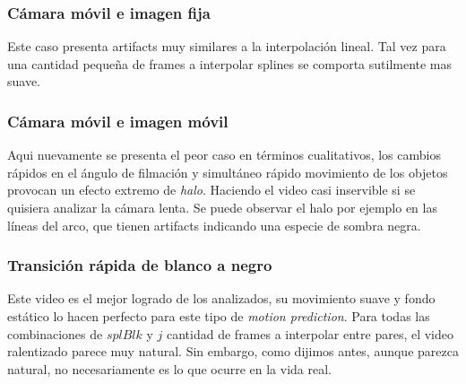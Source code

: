 \subsubsection{Cámara móvil e imagen fija}
Este caso presenta artifacts muy similares a la interpolación lineal. Tal vez para una cantidad pequeña de frames a interpolar splines se comporta sutilmente mas suave.

\subsubsection{Cámara móvil e imagen móvil}
Aqui nuevamente se presenta el peor caso en términos cualitativos, los cambios rápidos en el ángulo de filmación y simultáneo rápido movimiento de los objetos provocan un efecto extremo de \emph{halo}. Haciendo el video casi inservible si se quisiera analizar la cámara lenta. Se puede observar el halo por ejemplo en las líneas del arco, que tienen artifacts indicando una especie de sombra negra. 

\subsubsection{Transición rápida de blanco a negro}
Este video es el mejor logrado de los analizados, su movimiento suave y fondo estático lo hacen perfecto para este tipo de \emph{motion prediction}. Para todas las combinaciones de $splBlk$ y $j$ cantidad de frames a interpolar entre pares, el video ralentizado parece muy natural. Sin embargo, como dijimos antes, aunque parezca natural, no necesariamente es lo que ocurre en la vida real.

